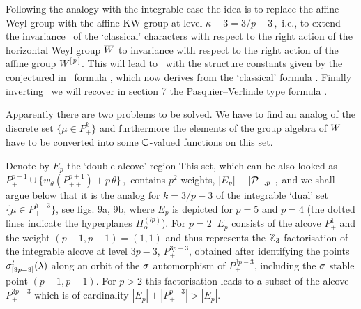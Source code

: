 Following the analogy with the integrable  case the idea is to
replace the affine Weyl group with the affine KW group at level
$\kappa-3=3/p-3\,,$  i.e., to extend the invariance \resa\ of the
`classical' characters with respect to the right action of the
horizontal Weyl group $\overline W$ to invariance  with respect to the
right action of the affine group $W^{[p]}$.  This will lead to
\Iqch\ with the  structure constants given by the conjectured in
\FGP\ formula \ws, which now derives from the `classical' formula
\strc. Finally  inverting \Iqch\ we will recover in section 7 the
Pasquier--Verlinde  type formula \pasv.

Apparently there are two  problems to be solved. We have to find
an analog of the discrete set $\{\mu\in P_+^{k}\}$ and
furthermore the elements of the group algebra of $\tilde W$  have to
be converted into some $\Bbb C$-valued functions on this set.

 Denote by $E_p$ the `double alcove' region 
%
\eqn{}
%
This set, which can be also looked as $P_+^{p-1}\cup
\{w_{\theta}(P_{++}^{p+1}) +p \, \theta \}\,,$ 
contains $p^2$ weights,  $|E_p|\equiv |{\cal P}_{+,p}|\,,$ and we
shall argue below that it is the analog for $k=3/p-3$ of the
integrable `dual' set $\{\mu\in P_+^{h-3}\}$, see figs. 9a, 9b,
where $E_p$ is depicted for $p=5$ and $p=4$ (the dotted lines
indicate the hyperplanes $H_\alpha^{(l p)}$).  For $p=2\ $ $E_p$
consists of the alcove $P_+^1$ and the weight $(p-1,p-1)=(1,1)$
and thus  represents the $\Bbb Z_3$ factorisation of the integrable
alcove at level $3p-3$, $P_+^{3p-3}$, obtained after identifying
the points $\sigma_{[3p-3]}^l(\lambda)$ along an orbit of the $\sigma$
automorphism of $P_+^{3p-3}$, including the $\sigma$ stable point
$(p-1,p-1)$. For $p>2$ this factorisation leads to a subset of
the alcove $P_+^{3p-3}$ which is of cardinality $|E_p|+
|P_+^{p-3}|> |E_p|$.
 \medskip

